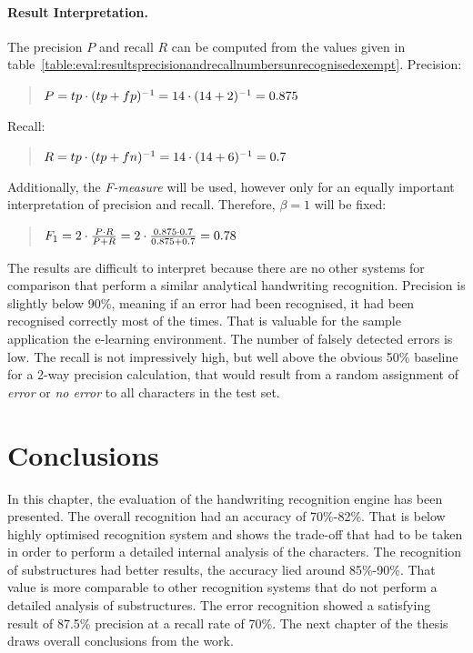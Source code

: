 \paragraph{Result Interpretation.}
The precision \(P\) and recall \(R\) can be computed from the values given in 
table~\ref{table:eval:resultsprecisionandrecallnumbersunrecognisedexempt}.
Precision:
\begin{quote}
\(
P=tp \cdot (tp+fp)^{-1} \\
= 14 \cdot (14+2)^{-1} \\
= 0.875
\)
\end{quote}
Recall:
\begin{quote}
\(
R=tp \cdot (tp+fn)^{-1} \\
=14 \cdot (14+6)^{-1} \\
=0.7
\)  
\end{quote}
Additionally, the \emph{F-measure} will be used, however only for an equally 
important interpretation of precision and recall. Therefore, \(\beta = 1\) will
be fixed:
\begin{quote}
\(
F_{1} = 2 \cdot \frac{P \cdot R }{P + R} \\
 = 2 \cdot \frac{0.875 \cdot 0.7 }{0.875 + 0.7} \\
 = 0.78
\)
\end{quote}
The results are difficult to interpret because there are no other systems for 
comparison that perform a similar analytical handwriting recognition.
Precision is slightly below 90\%, meaning if an error had been recognised,
it had been recognised correctly most of the times.
That is valuable for the sample application the e-learning environment.
The number of falsely detected errors is low.
The recall is not impressively high, 
but well above the obvious 50\% baseline for a 2-way precision calculation,
that would result from a random assignment of \emph{error} or \emph{no error}
to all characters in the test set.

\section{Conclusions}
\label{sec:eval:conclusions}

In this chapter, the evaluation of the handwriting recognition engine has 
been presented. The overall recognition had an accuracy of 70\%-82\%.
That is below highly optimised recognition system and shows the trade-off that
had to be taken in order to perform a detailed internal analysis of the 
characters.
The recognition of substructures had better results, the accuracy lied around
85\%-90\%. That value is more comparable to other recognition systems that do
not perform a detailed analysis of substructures.
The error recognition showed a satisfying result of 87.5\% precision at a recall 
rate of 70\%.
The next chapter of the thesis draws overall conclusions from the work.